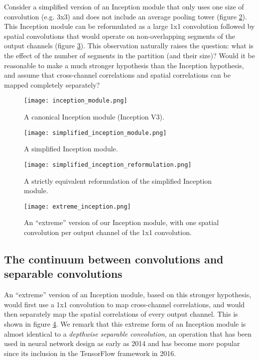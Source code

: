 \documentclass[10pt,twocolumn,letterpaper]{article}
\begin{document}
Consider a simplified version of an Inception module that only uses one size of convolution (e.g. 3x3) and does not include an average pooling tower (figure \ref{simplified_inception_module}). This Inception module can be reformulated as a large 1x1 convolution followed by spatial convolutions that would operate on non-overlapping segments of the output channels (figure \ref{simplified_inception_reformulation}). This observation naturally raises the question: what is the effect of the number of segments in the partition (and their size)? Would it be reasonable to make a much stronger hypothesis than the Inception hypothesis, and assume that cross-channel correlations and spatial correlations can be mapped completely separately?


\begin{figure}[!ht]
  \caption{A canonical Inception module (Inception V3).}
  \label{inception_module}
  \centering
    \texttt{[image: inception\_module.png]}
\end{figure}

\begin{figure}[!ht]
  \caption{A simplified Inception module.}
  \label{simplified_inception_module}
  \centering
    \texttt{[image: simplified\_inception\_module.png]}
\end{figure}

\begin{figure}[!ht]
  \caption{A strictly equivalent reformulation of the simplified Inception module.}
  \label{simplified_inception_reformulation}
  \centering
    \texttt{[image: simplified\_inception\_reformulation.png]}
\end{figure}

\begin{figure}[!ht]
  \caption{An ``extreme'' version of our Inception module, with one spatial convolution per output channel of the 1x1 convolution.}
  \label{extreme_inception}
  \centering
    \texttt{[image: extreme\_inception.png]}
\end{figure}


\subsection{The continuum between convolutions and separable convolutions} 

An ``extreme'' version of an Inception module, based on this stronger hypothesis, would first use a 1x1 convolution to map cross-channel correlations, and would then separately map the spatial correlations of every output channel. This is shown in figure \ref{extreme_inception}. We remark that this extreme form of an Inception module is almost identical to a \textit{depthwise separable convolution}, an operation that has been used in neural network design as early as 2014 \cite{sifre14} and has become more popular since its inclusion in the TensorFlow framework \cite{tensorflow2015-whitepaper} in 2016.
\end{document}
